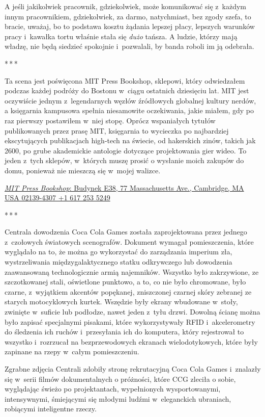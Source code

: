 \documentclass[oneside,polish,11pt,rmheadings]{mwbk}
\newcommand{\threeast}{\par\centerline{*\,*\,*}\medskip\par}
\begin{document}
A jeśli jakikolwiek pracownik, gdziekolwiek, może komunikować się z~każdym innym pracownikiem, gdziekolwiek, za darmo, natychmiast, bez zgody szefa, to bracie, uważaj, bo to podstawa kosztu żądania lepszej płacy, lepszych warunków pracy i~kawałka tortu właśnie stała się \textit{dużo }tańsza. A ludzie, którzy mają władzę, nie będą siedzieć spokojnie i~pozwalali, by banda roboli im ją odebrała.

\bigskip
\threeast

Ta scena jest poświęcona MIT Press Bookshop, sklepowi, który odwiedzałem podczas każdej podróży do Bostonu w~ciągu ostatnich dziesięciu lat. MIT jest oczywiście jednym z~legendarnych węzłów źródłowych globalnej kultury nerdów, a księgarnia kampusowa spełnia niesamowite oczekiwania, jakie miałem, gdy po raz pierwszy postawiłem w~niej stopę. Oprócz wspaniałych tytułów publikowanych przez prasę MIT, księgarnia to wycieczka po najbardziej ekscytujących publikacjach high-tech na świecie, od hakerskich zinów, takich jak 2600, po grube akademickie antologie dotyczące projektowania gier wideo. To jeden z~tych sklepów, w~których muszę prosić o wysłanie moich zakupów do domu, ponieważ nie mieszczą się w~mojej walizce.

\href{https://mitpressbookstore.mit.edu/}{\textit{MIT Press Bookshop}: Budynek E38, 77 Massachusetts Ave., Cambridge, MA USA 02139-4307 +1 617 253 5249} 

\bigskip
\threeast

Centrala dowodzenia Coca Cola Games została zaprojektowana przez jednego z~czołowych światowych scenografów. Dokument wymagał pomieszczenia, które wyglądało na to, że można go wykorzystać do zarządzania imperium zła, wystrzeliwania międzygalaktycznego statku odkrywczego lub dowodzenia zaawansowaną technologicznie armią najemników. Wszystko było zakrzywione, ze szczotkowanej stali, oświetlone punktowo, a to, co nie było chromowane, było czarne, z~wyjątkiem akcentów popękanej, zniszczonej czarnej skóry zebranej ze starych motocyklowych kurtek. Wszędzie były ekrany wbudowane w~stoły, zwinięte w~suficie lub podłodze, nawet jeden z~tyłu drzwi. Dowolną ścianę można było zapisać specjalnymi pisakami, które wykorzystywały RFID i~akcelerometry do śledzenia ich ruchów i~przesyłania ich do komputera, który rejestrował to wszystko i~rozrzucał na bezprzewodowych ekranach wielodotykowych, które były zapinane na rzepy w~całym pomieszczeniu.

Zgrabne zdjęcia Centrali zdobiły stronę rekrutacyjną Coca Cola Games i~znalazły się w~serii filmów dokumentalnych o próżności, które CCG zleciła o sobie, wyglądając świeżo po projektantach, wypełnionych wysportowanymi, intensywnymi, śmiejącymi się młodymi ludźmi w~eleganckich ubraniach, robiącymi inteligentne rzeczy.
\end{document}
